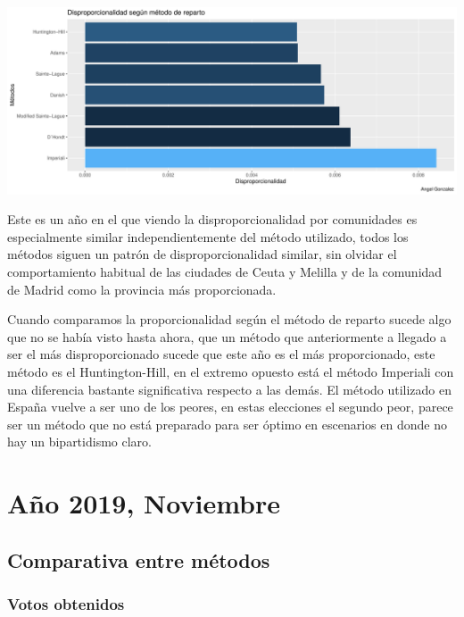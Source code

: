 \documentclass[12pt,a4paper,]{book}
\numberwithin{dummy}{section}
\theoremstyle{ocrenumbox}
\theoremstyle{blacknumex}
\theoremstyle{blacknumbox}
\theoremstyle{ocrenum}
\theoremstyle{ocrenum}
\begin{document}
\begin{center}\includegraphics[width=0.95\linewidth]{figurasR/unnamed-chunk-177-2} \end{center}

Este es un año en el que viendo la disproporcionalidad por comunidades
es especialmente similar independientemente del método utilizado, todos
los métodos siguen un patrón de disproporcionalidad similar, sin olvidar
el comportamiento habitual de las ciudades de Ceuta y Melilla y de la
comunidad de Madrid como la provincia más proporcionada.

Cuando comparamos la proporcionalidad según el método de reparto sucede
algo que no se había visto hasta ahora, que un método que anteriormente
a llegado a ser el más disproporcionado sucede que este año es el más
proporcionado, este método es el Huntington-Hill, en el extremo opuesto
está el método Imperiali con una diferencia bastante significativa
respecto a las demás. El método utilizado en España vuelve a ser uno de
los peores, en estas elecciones el segundo peor, parece ser un método
que no está preparado para ser óptimo en escenarios en donde no hay un
bipartidismo claro.

\hypertarget{auxf1o-2019-noviembre}{%
\section{Año 2019, Noviembre}\label{auxf1o-2019-noviembre}}

\hypertarget{comparativa-entre-muxe9todos-14}{%
\subsection{Comparativa entre
métodos}\label{comparativa-entre-muxe9todos-14}}

\hypertarget{votos-obtenidos-14}{%
\subsubsection{Votos obtenidos}\label{votos-obtenidos-14}}
\end{document}
